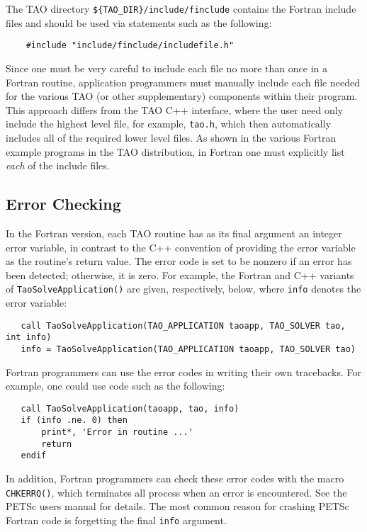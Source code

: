 The TAO directory {\tt \$\{TAO\_DIR\}/include/finclude}
contains the Fortran include files
and should be used via statements 
such as the following:
\begin{verbatim}
    #include "include/finclude/includefile.h"
\end{verbatim}
\noindent
Since one must be very careful to include each file no more than once
in a Fortran routine, application programmers must manually include
each file needed for the various TAO (or other supplementary)
components within their program.  This approach differs from the TAO
C++ interface, where the user need only include the highest level
file, for example, {\tt tao.h}, which then automatically
includes all of the required lower level files.  As shown in the
various Fortran example programs in the TAO distribution, in Fortran
one must explicitly list {\em each} of the include files.


\subsection{Error Checking}
\label{sec:fortran_errors}

In the Fortran version, each TAO routine has as its final argument
an integer error variable, in contrast to the C++ convention of
providing the error variable as the routine's return value.  The error
code is set to be nonzero if an error has been detected; otherwise, it
is zero.  For example, the Fortran and C++ variants of {\tt TaoSolveApplication()} are
given, respectively, below, where {\tt info} denotes the error variable:
\begin{verbatim}
   call TaoSolveApplication(TAO_APPLICATION taoapp, TAO_SOLVER tao, int info)
   info = TaoSolveApplication(TAO_APPLICATION taoapp, TAO_SOLVER tao)
\end{verbatim}
\noindent

Fortran programmers can use the error codes in writing their own
tracebacks.  For example, one could use code such as the following:
\begin{verbatim}
   call TaoSolveApplication(taoapp, tao, info)
   if (info .ne. 0) then
       print*, 'Error in routine ...'
       return
   endif
\end{verbatim}
\noindent
In addition, Fortran programmers can check these error codes with the
macro {\tt CHKERRQ()}, which terminates all process when an error
is encountered.  See the PETSc users manual for details.  The most
common reason for crashing PETSc Fortran code is forgetting the final
{\tt info} argument.


